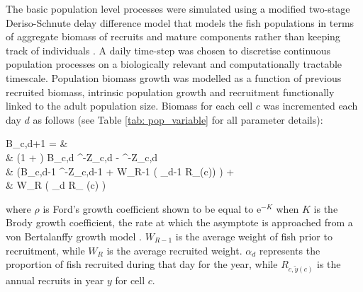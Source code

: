 \documentclass[preprint]{elsarticle}
\let\oldequation\equation
\let\oldendequation\endequation
\renewenvironment{equation}
 {\linenomathNonumbers\oldequation}
 {\oldendequation\endlinenomath}
\begin{document}
The basic population level processes were simulated using a modified two-stage
Deriso-Schnute delay difference model that models the fish populations in terms
of aggregate biomass of recruits and mature components rather than keeping
track of individuals \citep{Deriso1980, Schnute1985, Dichmont2003}. A daily
time-step was chosen to discretise continuous population processes on a
biologically relevant and computationally tractable timescale. Population
biomass growth was modelled as a function of previous recruited biomass,
intrinsic population growth and recruitment functionally linked to the adult
population size. Biomass for each cell $c$ was incremented each day $d$ as
follows (see Table \ref{tab: pop_variable} for all parameter details): 
\begin{equation}
	\begin{split}
	B_{c,d+1} = &\\
	& \left(1 + \rho \right) B_{c,d} \cdot {}^{-Z_{c,d}} - \rho \cdot
	^{-Z_{c,d}} \hspace{2.9cm}
	\times \\  
	& \left(B_{c,d-1} \cdot {}^{-Z_{c,d-1}} + W_{R-1} \cdot \left( \alpha_{d-1} \cdot
	R_{\left(c\right)}\right) \right)
	\hspace{0.9cm} + \\
	& W_{R} \cdot \left( \alpha_{d} \cdot R_{ \left(c\right)}
	\right) \\
	\end{split}
\end{equation}
where $\rho$ is Ford's growth coefficient shown to be equal to
$\mathrm{e}^{-K}$ when $K$ is the Brody growth coefficient, the rate at which
the asymptote is approached from a von Bertalanffy growth model
\citep{Schnute1985}. $W_{R-1}$ is the average weight of fish prior to
recruitment, while $W_{R}$ is the average recruited weight. $\alpha_{d}$
represents the proportion of fish recruited during that day for the year, while
$R_{c,\tilde{y}(c)}$ is the annual recruits in year $y$ for cell $c$. \\
\end{document}
